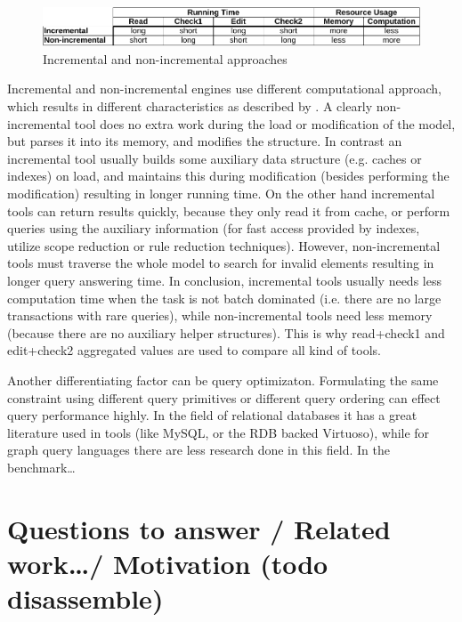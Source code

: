 

\begin{figure}[Hht]
\includegraphics[width=2\columnwidth]{figures/incNonInc.pdf}
\caption{Incremental and non-incremental approaches}
\label{table:incNonInc}
\end{figure}

Incremental and non-incremental engines use different computational approach,
which results in different characteristics as described by
. A clearly non-incremental tool does no extra work
during the load or modification of the model, but parses it into its memory, and
modifies the structure. In contrast an incremental tool usually builds some
auxiliary data structure (e.g. caches or indexes) on load, and maintains this
during modification (besides performing the modification) resulting in longer
running time. On the other hand incremental tools can return results quickly,
because they only read it from cache, or perform queries using the auxiliary
information (for fast access provided by indexes, utilize scope reduction or
rule reduction techniques). However, non-incremental tools must traverse the
whole model to search for invalid elements resulting in longer query answering
time. In conclusion, incremental tools usually needs less computation time when
the task is not batch dominated (i.e. there are no large transactions with rare
queries), while non-incremental tools need less memory (because there are no
auxiliary helper structures). This is why read+check1 and edit+check2 aggregated
values are used to compare all kind of tools.

Another differentiating factor can be query optimizaton. Formulating the same
constraint using different query primitives or different query ordering can
effect query performance highly. In the field of relational databases it has a
great literature used in tools (like MySQL, or the RDB backed Virtuoso), while
for graph query languages there are less research done in this field. 
 In the benchmark\ldots {}

\section{Questions to answer / Related work\ldots / Motivation (todo disassemble)}

